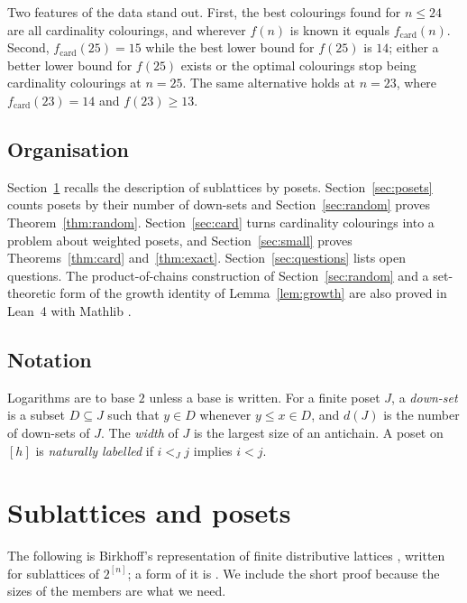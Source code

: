 \documentclass[11pt,reqno]{amsart}
\numberwithin{equation}{section}
\theoremstyle{plain}
\theoremstyle{definition}
\theoremstyle{remark}
\newcommand{\fc}{f_{\mathrm{card}}}
\begin{document}
Two features of the data stand out. First, the best colourings found for
$n\le24$ are all cardinality colourings, and wherever $f(n)$ is known it
equals $\fc(n)$. Second, $\fc(25)=15$ while the best lower bound for
$f(25)$ is $14$; either a better lower bound for $f(25)$ exists or the
optimal colourings stop being cardinality colourings at $n=25$. The same
alternative holds at $n=23$, where $\fc(23)=14$ and $f(23)\ge13$.

\subsection*{Organisation}
Section~\ref{sec:birkhoff} recalls the description of sublattices by
posets. Section~\ref{sec:posets} counts posets by their number of down-sets
and Section~\ref{sec:random} proves Theorem~\ref{thm:random}.
Section~\ref{sec:card} turns cardinality colourings into a problem about
weighted posets, and Section~\ref{sec:small} proves
Theorems~\ref{thm:card} and~\ref{thm:exact}. Section~\ref{sec:questions}
lists open questions. The product-of-chains construction of
Section~\ref{sec:random} and a set-theoretic form of the growth identity of
Lemma~\ref{lem:growth} are also proved in Lean~4 \cite{MU21} with Mathlib
\cite{Mathlib20}.

\subsection*{Notation}
Logarithms are to base $2$ unless a base is written. For a finite poset
$J$, a \emph{down-set} is a subset $D\subseteq J$ such that $y\in D$
whenever $y\le x\in D$, and $d(J)$ is the number of down-sets of $J$. The
\emph{width} of $J$ is the largest size of an antichain. A poset on $[h]$ is
\emph{naturally labelled} if $i<_Jj$ implies $i<j$.

\section{Sublattices and posets}
\label{sec:birkhoff}

The following is Birkhoff's representation of finite distributive
lattices \cite{Bi37}, written for sublattices of $2^{[n]}$; a form of it is
\cite[Lemma~7.8]{BMB26v5}. We include the short proof because the sizes of
the members are what we need.
\end{document}
